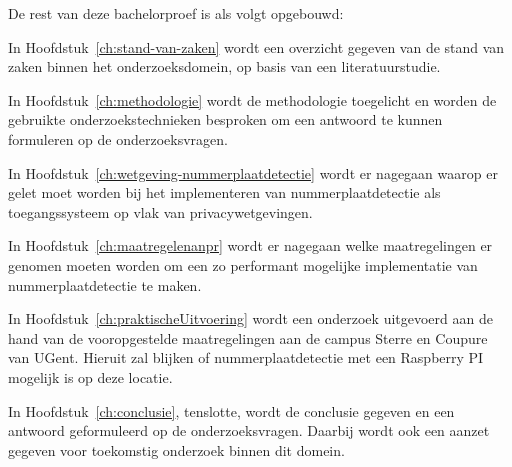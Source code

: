 
De rest van deze bachelorproef is als volgt opgebouwd:

In Hoofdstuk~\ref{ch:stand-van-zaken} wordt een overzicht gegeven van de stand van zaken binnen het onderzoeksdomein, op basis van een literatuurstudie.

In Hoofdstuk~\ref{ch:methodologie} wordt de methodologie toegelicht en worden de gebruikte onderzoekstechnieken besproken om een antwoord te kunnen formuleren op de onderzoeksvragen.

In Hoofdstuk~\ref{ch:wetgeving-nummerplaatdetectie} wordt er nagegaan waarop er gelet moet worden bij het implementeren van nummerplaatdetectie als toegangssysteem op vlak van privacywetgevingen.

In Hoofdstuk~\ref{ch:maatregelenanpr} wordt er nagegaan welke maatregelingen er genomen moeten worden om een zo performant mogelijke implementatie van nummerplaatdetectie te maken.

In Hoofdstuk~\ref{ch:praktischeUitvoering} wordt een onderzoek uitgevoerd aan de hand van de vooropgestelde maatregelingen aan de campus Sterre en Coupure van UGent. Hieruit zal blijken of nummerplaatdetectie met een Raspberry PI mogelijk is op deze locatie.

In Hoofdstuk~\ref{ch:conclusie}, tenslotte, wordt de conclusie gegeven en een antwoord geformuleerd op de onderzoeksvragen. Daarbij wordt ook een aanzet gegeven voor toekomstig onderzoek binnen dit domein.